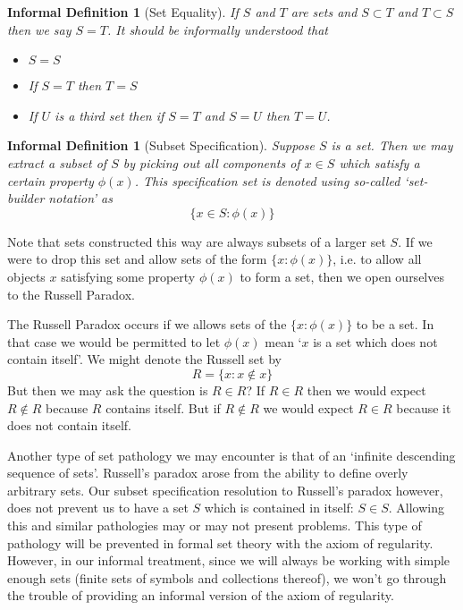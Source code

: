 \documentclass[12pt]{article}
\theoremstyle{break}
\theoremstyle{break}
\theoremstyle{break}
\theoremstyle{break}
\theoremstyle{break}
\newtheorem{informal definition}[definition]{Informal Definition}
\begin{document}
\begin{informal definition}[Set Equality]
If $S$ and $T$ are sets and $S\subset T$ and $T\subset S$ then we say $S=T$.
It should be informally understood that
\begin{itemize}
\item{$S=S$}
\item{If $S=T$ then $T=S$}
\item{If $U$ is a third set then if $S=T$ and $S=U$ then $T=U$.}
\end{itemize}
\end{informal definition}

\begin{informal definition}[Subset Specification]
Suppose $S$ is a set.
Then we may extract a subset of $S$ by picking out all components of $x\in S$ which satisfy a certain property $\phi(x)$.
This specification set is denoted using so-called `set-builder notation' as
$$
\{x\in S: \phi(x)\}
$$
\end{informal definition}

Note that sets constructed this way are always subsets of a larger set $S$.
If we were to drop this set and allow sets of the form $\{x:\phi(x)\}$, i.e. to allow all objects $x$ satisfying some property $\phi(x)$ to form a set, then we open ourselves to the Russell Paradox.

The Russell Paradox occurs if we allows sets of the $\{x:\phi(x)\}$ to be a set.
In that case we would be permitted to let $\phi(x)$ mean `$x$ is a set which does not contain itself'.
We might denote the Russell set by
$$
R = \{x: x \not \in x\}
$$
But then we may ask the question is $R\in R$?
If $R\in R$ then we would expect $R\not \in R$ because $R$ contains itself.
But if $R\not \in R$ we would expect $R\in R$ because it does not contain itself.

Another type of set pathology we may encounter is that of an `infinite descending sequence of sets'.
Russell's paradox arose from the ability to define overly arbitrary sets.
Our subset specification resolution to Russell's paradox however, does not prevent us to have a set $S$ which is  contained in itself: $S\in S$.
Allowing this and similar pathologies may or may not present problems.
This type of pathology will be prevented in formal set theory with the axiom of regularity.
However, in our informal treatment, since we will always be working with simple enough sets (finite sets of symbols and collections thereof), we won't go through the trouble of providing an informal version of the axiom of regularity.
\end{document}
